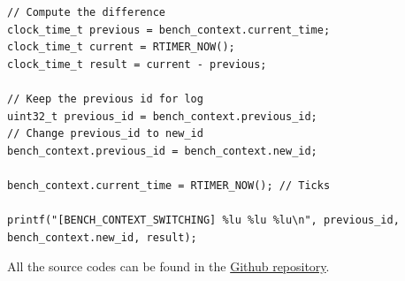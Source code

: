 \begin{lstlisting}[style=CStyle, float, label={lst:measurement-code}, caption={Source code of the benchmarking framework implemented in Contiki}]
// Compute the difference
clock_time_t previous = bench_context.current_time;
clock_time_t current = RTIMER_NOW();
clock_time_t result = current - previous;

// Keep the previous id for log
uint32_t previous_id = bench_context.previous_id;
// Change previous_id to new_id
bench_context.previous_id = bench_context.new_id;

bench_context.current_time = RTIMER_NOW(); // Ticks

printf("[BENCH_CONTEXT_SWITCHING] %lu %lu %lu\n", previous_id, bench_context.new_id, result);
\end{lstlisting}

All the source codes can be found in the \href{https://github.com/bench-os/bench-os}{Github repository}.